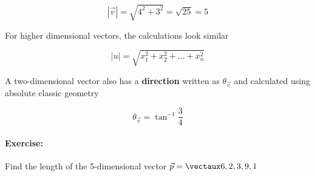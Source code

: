 \documentclass{article}
\begin{document}
\[
|\vec{v}| = \sqrt{4^2 + 3^2} = \sqrt{25} = 5
\]

For higher dimensional vectors, the calculations look similar 

\[
|u| = \sqrt{x_1^2 + x_2^2 + ... + x_n^2}
\]


A two-dimensional vector also has a \textbf{direction} written as $\theta_{\vec{v}}$ and calculated using absolute classic geometry

\[
\theta_{\vec{v}} = \tan^{-1}\frac{3}{4} 
\]


\paragraph{Exercise: } Find the length of the 5-dimensional vector $\vec{p} = \vect{6,2,3,9,1}$
\end{document}

